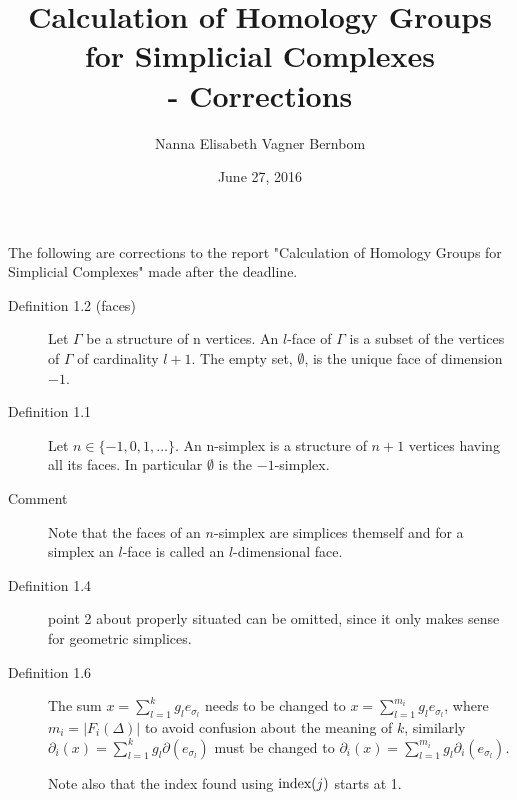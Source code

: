 \documentclass[11pt,a4paper]{article}
\begin{document}
\title{\textbf{Calculation of Homology Groups\\for Simplicial Complexes\\ - Corrections}}   
\author{Nanna Elisabeth Vagner Bernbom} 
\date{June 27, 2016}
\maketitle

The following are corrections to the report "Calculation of Homology Groups for Simplicial Complexes" made after the deadline.
\begin{description}
\item[Definition 1.2 (faces)] Let $\Gamma$ be a structure of n vertices. An $l$-face of $\Gamma$ is a subset of the vertices of $\Gamma$ of cardinality $l+1$. The empty set, $\emptyset$, is the unique face of dimension $-1$.
\item[Definition 1.1] Let $n\in\{-1,0,1,\dots\}$. An n-simplex is a structure of $n+1$ vertices having all its faces. In particular $\emptyset$ is the $-1$-simplex.
\item[Comment] Note that the faces of an $n$-simplex are simplices themself and for a simplex an $l$-face is called an $l$-dimensional face.
\item[Definition 1.4] point 2 about properly situated can be omitted, since it only makes sense for geometric simplices.
\item[Definition 1.6] The sum $x = \sum_{l=1}^kg_le_{\sigma_l}$ needs to be changed to $x = \sum_{l=1}^{m_i}g_le_{\sigma_l}$, where $m_i=|F_i(\Delta)|$ to avoid confusion about the meaning of $k$, similarly $\partial_i(x)=\sum_{l=1}^kg_l\partial (e_{\sigma_l})$ must be changed to $\partial_i(x)=\sum_{l=1}^{m_i}g_l\partial_i (e_{\sigma_l})$.

Note also that the index found using $\textnormal{index}(j)$ starts at 1.
\end{description}
\end{document}
